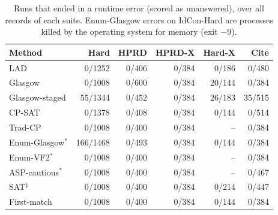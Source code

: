 \begin{table}[t]
\caption{Runs that ended in a runtime error (scored as unanswered), over all records of each suite. Enum-Glasgow errors on IdCon-Hard are processes killed by the operating system for memory (exit $-9$).}
\label{tab:errors}
\centering\footnotesize
\setlength{\tabcolsep}{3pt}
\begin{tabular}{lrrrrr}
\toprule
Method & Hard & HPRD & HPRD-X & Hard-X & Cite\\
\midrule
LAD & 0/1252 & 0/406 & 0/384 & 0/186 & 0/480\\
Glasgow & 0/1008 & 0/600 & 0/384 & 20/144 & 0/384\\
Glasgow-staged & 55/1344 & 0/452 & 0/384 & 26/183 & 35/515\\
CP-SAT & 0/1378 & 0/408 & 0/384 & 0/144 & 0/514\\
Trad-CP & 0/1008 & 0/400 & 0/384 & -- & 0/384\\
Enum-Glasgow$^\ast$ & 166/1468 & 0/493 & 0/384 & 0/144 & 0/384\\
Enum-VF2$^\ast$ & 0/1008 & 0/400 & 0/384 & -- & 0/384\\
ASP-cautious$^\ast$ & 0/1008 & 0/400 & 0/384 & -- & 0/467\\
SAT$^\ddagger$ & 0/1008 & 0/400 & 0/384 & 0/214 & 0/447\\
First-match & 0/1008 & 0/400 & 0/384 & 0/144 & 0/384\\
\bottomrule
\end{tabular}
\end{table}
